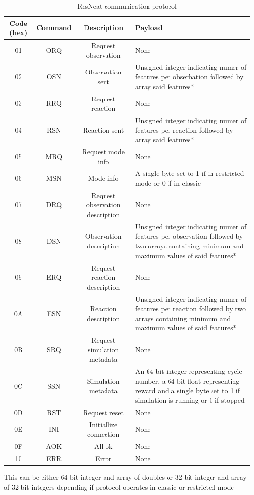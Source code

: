\begin{table} 
	\centering
	\caption{ResNeat communication protocol}
	\label{tab:resneat-protocol}
	\begin{tabularx}{\textwidth}{cccX}
		\hline
		\hline
		Code (hex)& Command& Description& Payload\\
		\hline
		01& ORQ&  Request observation& None\\
		02& OSN& Observation sent& Unsigned integer indicating numer of features per obserbation 
		followed by array said features*\\
		03& RRQ& Request reaction& None\\
		04& RSN& Reaction sent& Unsigned integer indicating numer of features per reaction 
		followed by array said features*\\
		05& MRQ& Request mode info& None\\
		06& MSN& Mode info& A single byte set to 1 if in restricted mode or 0 if in classic\\
		07& DRQ& Request observation description& None\\
		08& DSN& Observation description& Unsigned integer indicating numer of features per observation 
		followed by two arrays containing minimum and maximum values of  said features*\\
		09& ERQ& Request reaction description& None\\
		0A& ESN& Reaction description& Unsigned integer indicating numer of features per reaction 
		followed by two arrays containing minimum and maximum values of  said features*\\
		0B& SRQ& Request simulation metadata& None\\
		0C& SSN& Simulation metadata& An 64-bit integer representing cycle number, a 64-bit float 
		representing reward and a single byte set to 1 if simulation is running or 0 if stopped\\
		0D& RST& Request reset& None\\
		0E& INI& Initiallize connection& None\\
		0F& AOK& All ok& None\\
		10& ERR& Error& None\\

		\hline
		\hline
	\end{tabularx}
	\newline
	{\footnotesize *This can be either 64-bit integer and array of doubles or 32-bit integer
	and array of 32-bit integers depending if protocol operates in classic or restricted mode}
\end{table}

